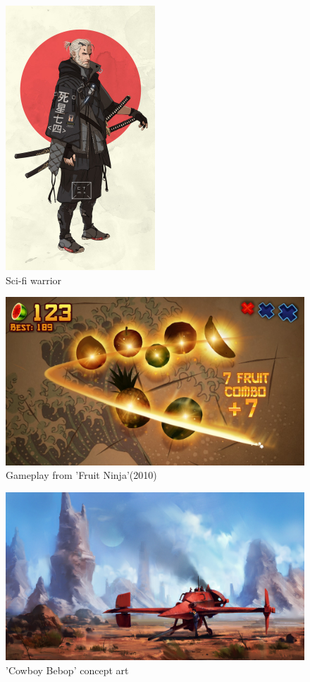 \documentclass[a4paper]{scrreprt}
\begin{document}
\begin{figure}[h!]
\centering
\includegraphics[width=0.5\textwidth]{Warrior}
\caption{Sci-fi warrior}
\end{figure}

\begin{figure}[h!]
\centering
\includegraphics[width=1\textwidth]{FruitNinja}
\caption{Gameplay from 'Fruit Ninja'(2010)}
\end{figure}

\begin{figure}[h!]
\centering
\includegraphics[width=1\textwidth]{Spaceship}
\caption{'Cowboy Bebop' concept art}
\end{figure}
\end{document}

